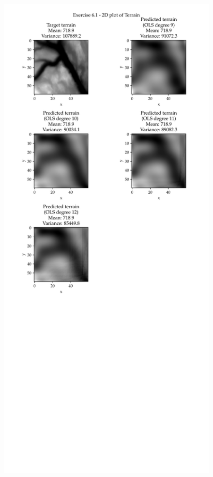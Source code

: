 \documentclass[11pt, a4paper]{article}
\begin{document}
\begin{figure}
  \includegraphics[scale=0.95]{figures/EX6_EX1_target_terrain_and_OLS_prediction_2D.pdf}
  \label{fig:EX6_1_OLS_2D}
\end{figure}
\end{document}
